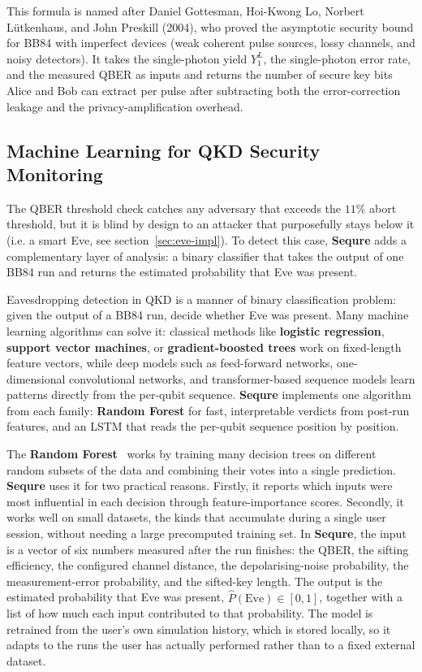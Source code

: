 \documentclass[12pt, a4paper]{article}
\begin{document}
This formula is named after Daniel Gottesman, Hoi-Kwong Lo,
Norbert Lütkenhaus, and John Preskill (2004), who proved the
asymptotic security bound for BB84 with imperfect devices
(weak coherent pulse sources, lossy channels, and noisy detectors). It takes the single-photon yield $Y_1^L$, the single-photon error rate, and the measured QBER as inputs and returns the number of secure key bits Alice and Bob can extract per pulse after subtracting both the error-correction leakage and the privacy-amplification overhead.



\subsection{Machine Learning for QKD Security Monitoring}
\label{sec:ml-detection}
\label{sec:lstm-impl}

The QBER threshold check catches any adversary that exceeds the
$11\%$ abort threshold, but it is blind by design to an attacker
that purposefully stays below it (i.e. a smart Eve, see section~\ref{sec:eve-impl}). To detect this case, \textbf{Sequre}
adds a complementary layer of analysis: a binary classifier that
takes the output of one BB84 run and returns the estimated
probability that Eve was present.

Eavesdropping detection in QKD is a manner of binary classification
problem: given the output of a BB84 run, decide whether Eve was
present. Many machine learning algorithms can solve it: classical
methods like \textbf{logistic regression}, \textbf{support vector
machines}, or \textbf{gradient-boosted trees} work on
fixed-length feature vectors, while deep models such as
feed-forward networks, one-dimensional convolutional networks,
and transformer-based sequence models learn patterns directly
from the per-qubit sequence. \textbf{Sequre} implements one
algorithm from each family: \textbf{Random Forest} for fast,
interpretable verdicts from post-run features, and an LSTM that
reads the per-qubit sequence position by position.


The \textbf{Random Forest}~\cite{breiman2001} works by training many
decision trees on different random subsets of the data and
combining their votes into a single prediction. \textbf{Sequre}
uses it for two practical reasons. Firstly, it reports which
inputs were most influential in each decision through
feature-importance scores. Secondly, it works well on small
datasets, the kinds that accumulate during a single user
session, without needing a large precomputed training set. In
\textbf{Sequre}, the input is a vector of six numbers measured
after the run finishes: the QBER, the sifting efficiency, the
configured channel distance, the depolarising-noise probability,
the measurement-error probability, and the sifted-key length.
The output is the estimated probability that Eve was present,
$\hat{P}(\text{Eve}) \in [0, 1]$, together with a list of how
much each input contributed to that probability. The model is
retrained from the user's own simulation history, which is stored
locally, so it adapts to the runs the user has actually performed rather than to a fixed external dataset.
\end{document}
